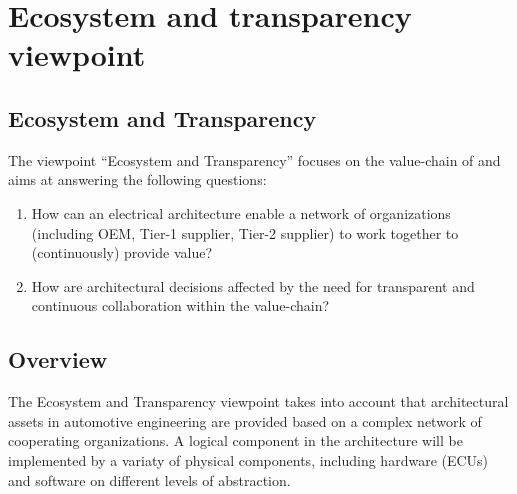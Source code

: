 \section{Ecosystem and transparency viewpoint}\label{sec:ET_VP}
\renewcommand{\Fillin}[1]{{Ecosystem and Transparency}}
\subsection{\Fillin{Viewpoint Name}}\label{vp:eco}


The viewpoint ``\Fillin{Viewpoint Name}'' focuses on the value-chain of  and aims at answering the following questions:
\begin{enumerate}
\item How can an electrical architecture enable a network of organizations (including OEM, Tier-1 supplier, Tier-2 supplier) to work together to (continuously) provide value?
\item How are architectural decisions affected by the need for transparent and continuous collaboration within the value-chain?
\end{enumerate}

\subsection{Overview} 


The \Fillin{Viewpoint Name} viewpoint takes into account that architectural assets in automotive engineering are provided based on a complex network of cooperating organizations. 
A logical component in the architecture will be implemented by a variaty of physical components, including hardware (ECUs) and software on different levels of abstraction. 


